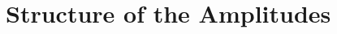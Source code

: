 \documentclass[main.tex]{subfiles}
\begin{document}


\section{Structure of the Amplitudes}
\label{wyjsec:amp}
\end{document}
